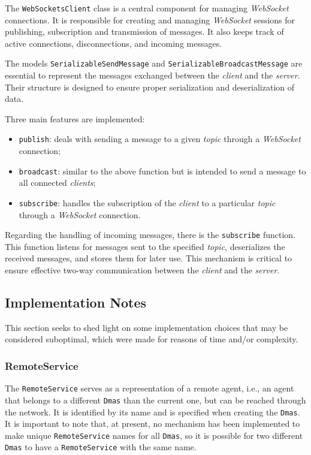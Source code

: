 {{The \texttt{WebSocketsClient} class is a central component for managing \textit{WebSocket} connections.
It is responsible for creating and managing \textit{WebSocket} sessions for publishing,
subscription and transmission of messages. It also keeps track of active connections, disconnections, and incoming messages.

The models \texttt{SerializableSendMessage} and \texttt{SerializableBroadcastMessage} are essential to represent the messages exchanged between the \textit{client} and
the \textit{server}. Their structure is designed to ensure proper serialization and deserialization of data.

Three main features are implemented:
\begin{itemize}
    \item \texttt{publish}: deals with sending a message to a given \textit{topic} through a \textit{WebSocket} connection;
    \item \texttt{broadcast}: similar to the above function but is intended to send a message to all connected \textit{clients};
    \item \texttt{subscribe}: handles the subscription of the \textit{client} to a particular \textit{topic} through a \textit{WebSocket} connection.
\end{itemize}
Regarding the handling of incoming messages, there is the \texttt{subscribe} function.
This function listens for messages sent to the specified \textit{topic}, deserializes the received messages, and stores them for later use.
This mechanism is critical to ensure effective two-way communication between the \textit{client} and the \textit{server}.

\subsection{Implementation Notes}
This section seeks to shed light on some implementation choices that may be considered suboptimal, which were made for reasons of time and/or complexity.

\subsubsection{RemoteService}
The \texttt{RemoteService} serves as a representation of a remote agent, i.e., an agent that belongs to a different \texttt{Dmas} than the current one, but can be reached through the network.
It is identified by its name and is specified when creating the \texttt{Dmas}. It is important to note that, at present, no mechanism has been implemented to make
unique \texttt{RemoteService} names for all \texttt{Dmas}, so it is possible for two different \texttt{Dmas} to have a \texttt{RemoteService} with the same name.

}}
